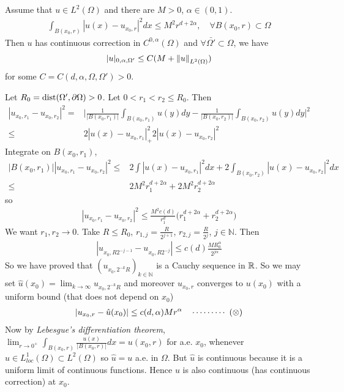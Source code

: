 \documentclass[12pt,a4paper]{article}
\newenvironment{proof}
{\begin{changemargin}{0.5cm}{0.5cm} 
	}%
	{\end{changemargin}
}
\newenvironment{p}
{\begin{proof} 
	}%
	{\end{proof}
}
\begin{document}
\thm Assume that $u\in L^2(\Omega)$ and there are $M>0$, $\alpha \in (0,1)$.
\begin{align*}
\int_{B(x_0, r)} |u (x) - u_{x_0, r}|^2 dx \leq M^2 r^{d+ 2\alpha}, \quad \forall B(x_0,r) \subset \Omega
\end{align*}
Then $u$ has continuous correction in $C^{0, \alpha}(\Omega)$ and $\forall \bar{\Omega'} \subset \Omega$, we have 
\begin{align*}
|u|_{0, \alpha, \Omega'} \leq C(M + \snorms{u}{L^2(\Omega)})
\end{align*}
for some $C= C(d, \alpha, \Omega, \Omega') >0$.
\begin{p}
\pf Let $R_0 = \text{dist}(\Omega', \partial \Omega) >0$. Let $0< r_1< r_2 \leq R_0$. Then
\begin{align*}
|u_{x_0, r_1} - u_{x_0, r_2}|^2 =& \Big| \frac{1}{|B(x_0, r_1)|} \int_{B(x_0, r_1)}u(y)dy - \frac{1}{|B(x_0, r_2)|} \int_{B(x_0, r_2)}u(y)dy  \Big|^2 \\
\leq& 2|u(x) - u_{x_0, r_1}|^2 _+ 2|u(x) - u_{x_0, r_2}|^2
\end{align*}
Integrate on $B(x_0, r_1)$,
\begin{align*}
|B(x_0, r_1)| |u_{x_0, r_1} - u_{x_0, r_2}|^2 \leq & 2 \int |u(x) - u_{x_0, r_1}|^2  dx + 2\int_{B(x_0, r_2)}|u(x) - u_{x_0, r_2}|^2 dx \\
\leq & 2M^2 r_1^{d + 2\alpha} + 2M^2 r_2^{d+ 2\alpha}
\end{align*}
so
\begin{align*}
|u_{x_0, r_1} - u_{x_0, r_2}|^2 \leq \frac{M^2 c(d)}{r_1^d} \big( r_1^{d+2\alpha} + r_2^{d+ 2\alpha} \big)
\end{align*}
We want $r_1, r_2\rightarrow 0$. Take $R\leq R_0$, $r_{1,j} = \frac{R}{2^{j+1}}$, $r_{2,j} = \frac{R}{2^{j}}$, $j\in \mathbb{N}$. Then
\begin{align*}
|u_{x_0, R2^{-j-1}} - u_{x_0, R2^{-j}}| \leq c(d) \frac{M R_0^{\alpha}}{2^{j\alpha}}
\end{align*}
So we have proved that $(u_{x_0, 2^{-k}R})_{k\in\mathbb{N}}$ is a Cauchy sequence in $\mathbb{R}$. So we may set $\hat{u}(x_0) = \lim_{k\rightarrow \infty} u_{x_0, 2^{-k}R}$ and moreover $u_{x_0, r}$ converges to $u(x_0)$ with a uniform bound (that does not depend on $x_0$)
\begin{align*}
|u_{x_0, r} - \hat{u}(x_0)| \leq c(d, \alpha) Mr^{\alpha} \quad \cdots\cdots\cdots\,\,(\otimes)
\end{align*}
Now by \emph{Lebesgue's differentiation theorem}, $\lim_{r\rightarrow 0^+} \int_{B(x_0, r)} \frac{u(x)}{|B(x_0, r)|} dx = u(x_0, r)$ for a.e. $x_0$, whenever $u\in L^1_{loc}(\Omega) \subset L^2(\Omega)$ so $\hat{u} = u$ a.e. in $\Omega$. But $\hat{u}$ is continuous because it is a uniform limit of continuous functions. Hence $u$ is also continuous (has continuous correction) at $x_0$.
\s


\end{p}
\end{document}

